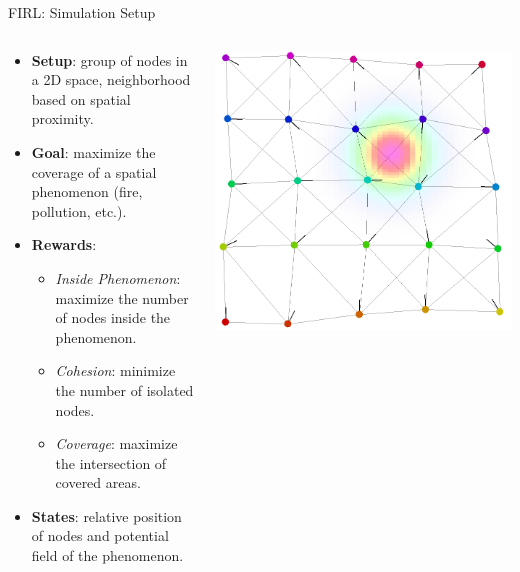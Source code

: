 \documentclass[presentation, 8pt,169]{beamer}\mode<presentation>{\usetheme{AMSBolognaFC}}
\begin{document}
\begin{frame}{FIRL: Simulation Setup}

  \begin{columns}
    \begin{column}{0.5\textwidth}  %
        \begin{itemize}
          \item \textbf{Setup}: group of nodes in a 2D space, neighborhood based on spatial proximity.
          \item \textbf{Goal}: maximize the coverage of a spatial phenomenon (fire, pollution, etc.).
          \item \textbf{Rewards}: 
            \begin{itemize}
              \item \emph{Inside Phenomenon}: maximize the number of nodes inside the phenomenon.
              \item \emph{Cohesion}: minimize the number of isolated nodes.
              \item \emph{Coverage}: maximize the intersection of covered areas.
            \end{itemize}
          \item \textbf{States}: relative position of nodes and potential field of the phenomenon.
        \end{itemize}
    \end{column}
    \begin{column}{0.5\textwidth}  %
      \centering
      \includegraphics[width=\textwidth]{img/coverage-setup.png}
    \end{column}
  \end{columns}
\end{frame}
\end{document}
